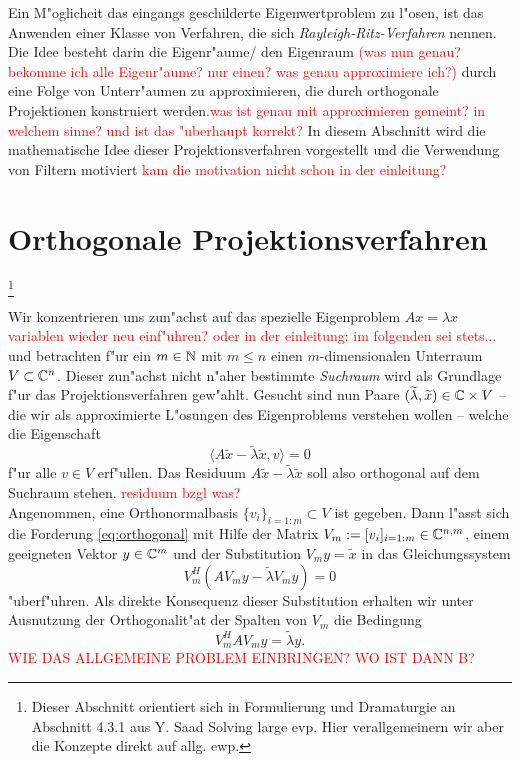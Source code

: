 Ein M"oglicheit das eingangs geschilderte Eigenwertproblem zu l"osen, ist
das Anwenden einer Klasse von Verfahren, die sich \emph{Rayleigh-Ritz-Verfahren}
nennen. Die Idee besteht darin die Eigenr"aume/ den Eigenraum \textcolor{red}{(was nun genau? bekomme ich alle
Eigenr"aume? nur einen? was genau approximiere ich?)} durch eine Folge von Unterr"aumen
zu approximieren, die durch orthogonale Projektionen konstruiert werden.\textcolor{red}{was ist genau
mit approximieren gemeint? in welchem sinne? und ist das "uberhaupt korrekt?} In diesem
Abschnitt wird die mathematische Idee dieser Projektionsverfahren vorgestellt und
die Verwendung von Filtern motiviert \textcolor{red}{kam die motivation nicht schon
in der einleitung?}

\section{Orthogonale Projektionsverfahren}
\footnote{Dieser Abschnitt orientiert sich in Formulierung und Dramaturgie an Abschnitt 4.3.1 aus Y. Saad Solving large evp. Hier verallgemeinern wir aber die Konzepte direkt auf allg. ewp.}

Wir konzentrieren uns zun"achst auf das spezielle Eigenproblem $Ax = \lambda x$ \textcolor{red}{variablen wieder neu einf"uhren? oder in der einleitung: im folgenden sei stets...} und betrachten f"ur ein $m\in\mathbb{N}$ mit $m\le n$
einen $m$-dimensionalen Unterraum $V\subset\mathbb{C}^n$. Dieser zun"achst nicht
n"aher bestimmte \emph{Suchraum} wird als Grundlage f"ur das Projektionsverfahren gew"ahlt.
Gesucht sind nun Paare $(\widetilde{\lambda}, \widetilde{x})\in\mathbb{C}\times V$ -- die wir als approximierte L"osungen des Eigenproblems verstehen wollen --
welche die Eigenschaft
\begin{equation}\label{eq:orthogonal}
\langle A\widetilde{x} - \widetilde{\lambda}\widetilde{x}, v\rangle=0
\end{equation}
f"ur alle $v\in V$ erf"ullen. Das Residuum $A\widetilde{x} - \widetilde{\lambda}\widetilde{x}$
soll also orthogonal auf dem Suchraum stehen. \textcolor{red}{residuum bzgl was?}\\

Angenommen, eine Orthonormalbasis $\{v_i\}_{i=1:m}\subset V$ ist gegeben.
Dann l"asst sich die Forderung \eqref{eq:orthogonal} mit Hilfe der Matrix $V_m :=[v_i]_{i=1:m}\in\mathbb{C}^{n,m}$, einem geeigneten Vektor
$y\in\mathbb{C}^m$ und der Substitution $V_m y=\widetilde{x}$ in das Gleichungssystem
\[
V_m^H(AV_m y - \widetilde{\lambda} V_m y) = 0
\]
"uberf"uhren. Als direkte Konsequenz dieser Substitution erhalten wir unter Ausnutzung der Orthogonalit"at der Spalten von $V_m$ die Bedingung
\[
V_m^H A V_m y = \widetilde{\lambda}y.
\]
\textcolor{red}{WIE DAS ALLGEMEINE PROBLEM EINBRINGEN? WO IST DANN B?}
